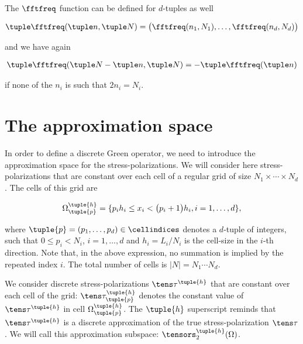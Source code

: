 \documentclass[oneside]{memoir}
\begin{document}
The \(\fftfreq\) function can be defined for \(d\)-tuples as well



\begin{equation*}
\begin{split}\tuple \fftfreq(\tuple n, \tuple N)
=\bigl(\fftfreq(n_1, N_1), \ldots, \fftfreq(n_d, N_d)\bigr)\end{split}\end{equation*}


and we have again



\begin{equation*}
\begin{split}\tuple \fftfreq(\tuple N-\tuple n, \tuple N)=-\tuple \fftfreq(\tuple n)\end{split}\end{equation*}


if none of the \(n_i\) is such that \(2n_i=N_i\).



\hypertarget{3470771881996884583}{}


\section{The approximation space}



In order to define a discrete Green operator, we need to introduce the approximation space for the stress-polarizations. We will consider here stress-polarizations that are constant over each cell of a regular grid of size \(N_1\times\cdots\times N_d\). The cells of this grid are



\begin{equation*}
\begin{split}\Omega_{\tuple{p}}^{\tuple{h}}=\{p_ih_i\leq x_i<\bigl(p_i+1\bigr)h_i, i=1,\ldots, d\},\end{split}\end{equation*}


where \(\tuple{p}=(p_1,\ldots,p_d)\in\cellindices\) denotes a \(d\)-tuple of integers, such that \(0\leq p_i<N_i\), \(i=1,\ldots, d\) and \(h_i=L_i/N_i\) is the cell-size in the \(i\)-th direction. Note that, in the above expression, no summation is implied by the repeated index \(i\). The total number of cells is \(\lvert N\rvert=N_1\cdots N_d\).



We consider discrete stress-polarizations \(\tens\tau^{\tuple{h}}\) that are constant over each cell of the grid: \(\tens\tau_{\tuple{p}}^{\tuple{h}}\) denotes the constant value of \(\tens\tau^{\tuple{h}}\) in cell \(\Omega_{\tuple{p}}^{\tuple{h}}\). The \(\tuple{h}\) superscript reminds that \(\tens\tau^{\tuple{h}}\) is a discrete approximation of the true stress-polarization \(\tens\tau\). We will call this approximation subspace: \(\tensors_2^{\tuple{h}}(\Omega)\).
\end{document}
